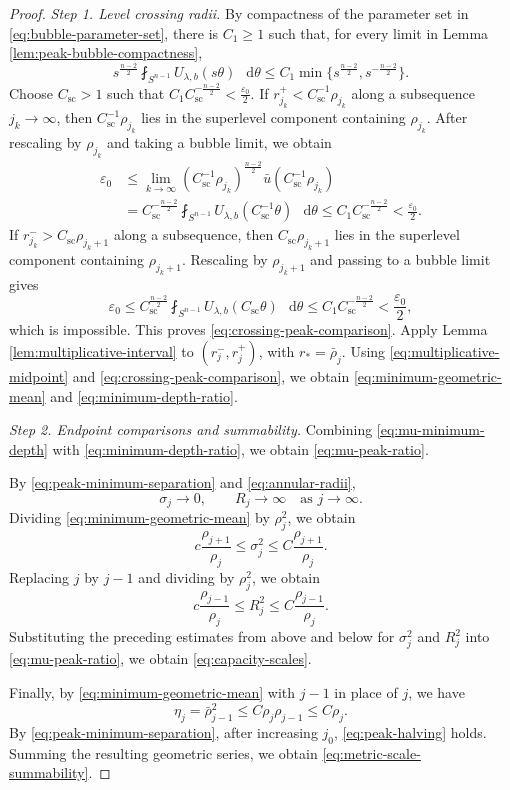 \documentclass[11pt]{article}
\numberwithin{equation}{section}
\theoremstyle{remark}
\newcommand{\Sph}{S}
\newcommand{\eps}{\varepsilon}
\newcommand{\dd}{\mathop{}\!\mathrm{d}}
\begin{document}
\begin{proof}
\emph{Step 1. Level crossing radii.}
By compactness of the parameter set in
\eqref{eq:bubble-parameter-set}, there is \(C_1\ge1\) such that, for every
limit in Lemma  \ref{lem:peak-bubble-compactness},
\[
 s^{\frac{n-2}{2}}
 \fint_{\Sph^{n-1}}U_{\lambda,b}(s\theta)\,\dd\theta
 \le C_1\min\{s^{\frac{n-2}{2}},s^{-\frac{n-2}{2}}\}.
\]
Choose \(C_{\mathrm{sc}}>1\) such that \(C_1C_{\mathrm{sc}}^{-\frac{n-2}{2}}
 <\frac{\eps_0}{2}\).
If \(r_{j_k}^+<C_{\mathrm{sc}}^{-1}\rho_{j_k}\) along a subsequence
\(j_k\to\infty\), then
\(C_{\mathrm{sc}}^{-1}\rho_{j_k}\) lies in the superlevel component containing
\(\rho_{j_k}\).
After rescaling by \(\rho_{j_k}\) and taking a bubble limit, we obtain
\[
 \begin{aligned}
 \eps_0
 &\le\lim_{k\to\infty}
 (C_{\mathrm{sc}}^{-1}\rho_{j_k})^{\frac{n-2}{2}}
 \bar u(C_{\mathrm{sc}}^{-1}\rho_{j_k})\\
 &=C_{\mathrm{sc}}^{-\frac{n-2}{2}}
 \fint_{\Sph^{n-1}}U_{\lambda,b}(C_{\mathrm{sc}}^{-1}\theta)\,\dd\theta
 \le C_1 C_{\mathrm{sc}}^{-\frac{n-2}{2}}<\frac{\eps_0}{2}.
 \end{aligned}
\]
{If \(r_{j_k}^->C_{\mathrm{sc}}\rho_{j_k+1}\) along a subsequence,
then \(C_{\mathrm{sc}}\rho_{j_k+1}\) lies in the superlevel component containing
\(\rho_{j_k+1}\).  Rescaling by \(\rho_{j_k+1}\) and passing to a bubble
limit gives}
\[
 \eps_0
 \le
 C_{\mathrm{sc}}^{\frac{n-2}{2}}
 \fint_{\Sph^{n-1}}U_{\lambda,b}(C_{\mathrm{sc}}\theta)\,\dd\theta
 \le C_1C_{\mathrm{sc}}^{-\frac{n-2}{2}}
 <\frac{\eps_0}{2},
\]
{which is impossible.}
This proves \eqref{eq:crossing-peak-comparison}.
Apply Lemma  \ref{lem:multiplicative-interval} to
\((r_j^-,r_j^+)\), with \(r_*=\bar\rho_j\).
{Using \eqref{eq:multiplicative-midpoint} and
\eqref{eq:crossing-peak-comparison}, we obtain
\eqref{eq:minimum-geometric-mean} and
\eqref{eq:minimum-depth-ratio}.}

\emph{Step 2. Endpoint comparisons and summability.}
{Combining \eqref{eq:mu-minimum-depth} with
\eqref{eq:minimum-depth-ratio}, we obtain
\eqref{eq:mu-peak-ratio}.}

By \eqref{eq:peak-minimum-separation} and
\eqref{eq:annular-radii},
\[
 \sigma_j\to0,
 \qquad
 R_j\to\infty
 \quad\text{as }j\to\infty.
\]
{Dividing \eqref{eq:minimum-geometric-mean} by \(\rho_j^2\),
we obtain}
\[
 c\frac{\rho_{j+1}}{\rho_j}
 \le\sigma_j^2
 \le C\frac{\rho_{j+1}}{\rho_j}.
\]
{Replacing \(j\) by \(j-1\) and dividing by \(\rho_j^2\), we
obtain}
\[
 c\frac{\rho_{j-1}}{\rho_j}
 \le R_j^2
 \le C\frac{\rho_{j-1}}{\rho_j}.
\]
{Substituting the preceding estimates from above and below for
\(\sigma_j^2\) and \(R_j^2\) into \eqref{eq:mu-peak-ratio}, we obtain
\eqref{eq:capacity-scales}.}

{Finally, by \eqref{eq:minimum-geometric-mean} with \(j-1\)
in place of \(j\), we have}
\[
 \eta_j=\bar\rho_{j-1}^2
 \le C\rho_j\rho_{j-1}
 \le C\rho_j.
\]
By \eqref{eq:peak-minimum-separation}, after increasing \(j_0\),
\eqref{eq:peak-halving} holds.
{Summing the resulting geometric series, we obtain
\eqref{eq:metric-scale-summability}.}
\end{proof}
\end{document}
